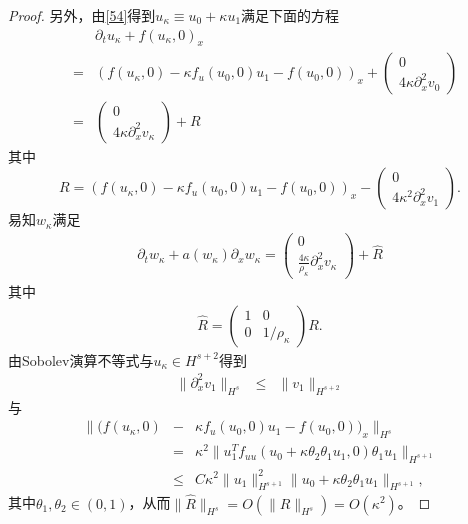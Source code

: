 \begin{proof}
另外，由\eqref{54}得到$u_\kappa \equiv u_0 +\kappa u_1$满足下面的方程
\begin{eqnarray*}
  &&\partial_t u_\kappa + f(u_\kappa,0)_x \nonumber \\
  &=&  (f(u_\kappa,0) - \kappa f_u(u_0,0)u_1 - f(u_0,0))_x + \left( \begin{array}{c} 0 \\ 4 \kappa \partial^2_x v_0 \end{array} \right) \nonumber \\
	&=& \left( \begin{array}{c} 0 \\ 4 \kappa \partial^2_x v_\kappa \end{array} \right)   + R
\end{eqnarray*}
其中
$$
R=(f(u_\kappa,0) - \kappa f_u(u_0,0)u_1 - f(u_0,0))_x -\left( \begin{array}{c} 0 \\ 4 \kappa^2 \partial^2_x v_1 \end{array} \right).
$$
易知$w_\kappa$满足
\begin{eqnarray}\label{580}
  \partial_t w_\kappa + a(w_\kappa) \partial_x w_\kappa = \left( \begin{array}{cc} 0 \\ \frac{4 \kappa}{\rho_\kappa} \partial^2_x v_\kappa \end{array} \right) + \hat R
\end{eqnarray}
其中
\begin{eqnarray*}
\hat{R} = \left( \begin{array}{cc} 1 & 0 \\ 0 & 1/\rho_\kappa \end{array} \right)R .
\end{eqnarray*}
由Sobolev演算不等式\cite{majda1984compressible}与$u_\kappa \in H^{s+2}$得到
\begin{eqnarray*}
  \|\partial^2_x v_1 \|_{H^s} &\le&  \|v_1\|_{H^{s+2}}
\end{eqnarray*}
与
\begin{eqnarray*}
  \|(f(u_\kappa,0) &-& \kappa f_u(u_0,0)u_1 - f(u_0,0))_x\|_{H^s} \\
  &=& \kappa^2 \| u_1^Tf_{uu}(u_0+\kappa \theta_2 \theta_1  u_1,0) \theta_1 u_1\|_{H^{s+1}} \\
  &\le&  C \kappa^2 \|u_1\|_{H^{s+1}}^2 \|u_0+\kappa \theta_2 \theta_1  u_1\|_{H^{s+1}},
\end{eqnarray*}
其中$\theta_1,\theta_2 \in (0,1)$，从而$\|\hat{R}\|_{H^s} =O(\|R\|_{H^s})= O(\kappa^2)$。



\end{proof}
